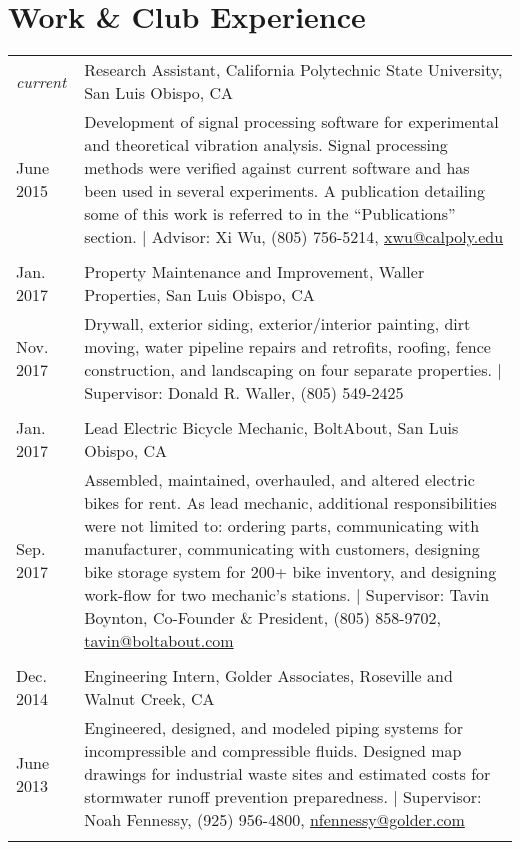 \documentclass[10pt]{article} %
\begin{document}
\section{ Work \& Club Experience}

	\begin{tabular}{p{.6in}|p{5.5in}}
		\emph{current}& Research Assistant, California Polytechnic State University, San Luis Obispo, CA \\
		June 2015& \footnotesize{Development of signal processing software for experimental and theoretical vibration analysis. Signal processing methods were verified against current software and has been used in several experiments. A publication detailing some of this work is referred to in the ``Publications'' section. | Advisor: Xi Wu, (805) 756-5214}, \href{mailto:xwu@calpoly.edu}{xwu@calpoly.edu}\\
		\multicolumn{2}{c}{} \\	[-.75em]	
		
		Jan. 2017& Property Maintenance and Improvement, Waller Properties, San Luis Obispo, CA\\
		Nov. 2017& \footnotesize{Drywall, exterior siding, exterior/interior painting, dirt moving, water pipeline repairs and retrofits, roofing, fence construction, and landscaping on four separate properties. | Supervisor: Donald R. Waller, (805) 549-2425}\\
		\multicolumn{2}{c}{} \\[-.75em]
		Jan. 2017& Lead Electric Bicycle Mechanic, BoltAbout, San Luis Obispo, CA\\
		Sep. 2017& \footnotesize{Assembled, maintained, overhauled, and altered electric bikes for rent. As lead mechanic, additional responsibilities were not limited to: ordering parts, communicating with manufacturer, communicating with customers, designing bike storage system for 200+ bike inventory, and designing work-flow for two mechanic's stations. | Supervisor: Tavin Boynton, Co-Founder \& President, (805) 858-9702, \href{mailto:tavin@boltabout.com}{tavin@boltabout.com}}\\
		\multicolumn{2}{c}{} \\[-.75em]
		
		Dec. 2014& Engineering Intern, Golder Associates, Roseville and Walnut Creek, CA \\
		June 2013&\footnotesize{Engineered, designed, and modeled piping systems for incompressible and compressible fluids. Designed map drawings for industrial waste sites and estimated costs for stormwater runoff prevention preparedness. | Supervisor: Noah Fennessy, (925) 956-4800}, \href{nfennessy@golder.com}{nfennessy@golder.com}\\
		\multicolumn{2}{c}{} \\	[-.75em]	
		

\end{tabular}
\end{document}
